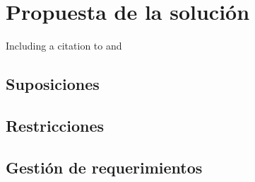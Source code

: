 \chapter{Propuesta de la solución}
\label{chapter:proposal}

Including a citation to \cite{latex} and \cite{Chakravarthy2009}

\Blindtext[3]





\section{Suposiciones}
\label{section:suposiciones}

\Blindtext[1]

\section{Restricciones}
\label{section:restricciones}

\Blindtext[1]



\section{Gestión de requerimientos}
\label{section:gestion}

\Blindtext[1]


